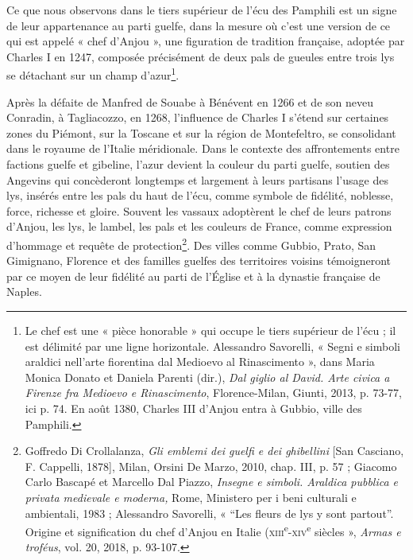 \documentclass[12pt,twoside,openany]{book}
\begin{document}
Ce que nous observons dans le tiers supérieur de l’écu des Pamphili est un signe de leur appartenance au parti guelfe, dans la mesure où c’est une version de ce qui est appelé « chef d’Anjou », une figuration de tradition française, adoptée par Charles I en 1247, composée précisément de deux pals de gueules entre trois lys se détachant sur un champ d’azur\footnote{Le chef est une « pièce honorable » qui occupe le tiers supérieur de l’écu ; il est délimité par une ligne horizontale. Alessandro Savorelli, « Segni e simboli araldici nell’arte fiorentina dal Medioevo al Rinascimento », dans Maria Monica Donato et Daniela Parenti (dir.), \textit{Dal giglio al David. Arte civica a Firenze fra Medioevo e Rinascimento}, Florence-Milan, Giunti, 2013, p. 73-77, ici p. 74. En août 1380, Charles III d’Anjou entra à Gubbio, ville des Pamphili.}.

Après la défaite de Manfred de Souabe à Bénévent en 1266 et de son neveu Conradin, à Tagliacozzo, en 1268, l’influence de Charles I s’étend sur certaines zones du Piémont, sur la Toscane et sur la région de Montefeltro, se consolidant dans le royaume de l’Italie méridionale. Dans le contexte des affrontements entre factions guelfe et gibeline, l’azur devient la couleur du parti guelfe, soutien des Angevins qui concèderont longtemps et largement à leurs partisans l’usage des lys, insérés entre les pals du haut de l’écu, comme symbole de fidélité, noblesse, force, richesse et gloire. Souvent les vassaux adoptèrent le chef de leurs patrons d’Anjou, les lys, le lambel, les pals et les couleurs de France, comme expression d’hommage et requête de protection\footnote{Goffredo Di Crollalanza, \textit{Gli emblemi dei guelfi e dei ghibellini} [San Casciano, F. Cappelli, 1878], Milan, Orsini De Marzo, 2010, chap. III, p. 57 ; Giacomo Carlo Bascapé et Marcello Dal Piazzo, \textit{Insegne e simboli. Araldica pubblica e privata medievale e moderna, }Rome, Ministero per i beni culturali e ambientali, 1983 ; Alessandro Savorelli, « “Les fleurs de lys y sont partout”. Origine et signification du chef d’Anjou en Italie (\textsc{xiii}\textsuperscript{e}-\textsc{xiv}\textsuperscript{e} siècles », \textit{Armas e troféus}, vol. 20, 2018, p. 93-107.}. Des villes comme Gubbio, Prato, San Gimignano, Florence et des familles guelfes des territoires voisins témoigneront par ce moyen de leur fidélité au parti de l’Église et à la dynastie française de Naples.
\end{document}
